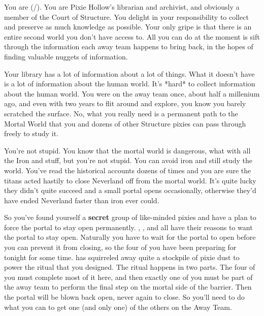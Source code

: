 \documentclass[char]{PP}
\begin{document}
\name{\cSLibrarian{}}

You are \cSLibrarian{} (\cSLibrarian{\They}/\cSLibrarian{\Them}). You are Pixie Hollow’s librarian and archivist, and obviously a member of the Court of Structure. You delight in your responsibility to collect and preserve as much knowledge as possible. Your only gripe is that there is an entire second world you don’t have access to. All you can do at the moment is sift through the information each away team happens to bring back, in the hopes of finding valuable nuggets of information.

Your library has a lot of information about a lot of things. What it doesn’t have is a lot of information about the human world. It’s *hard* to collect information about the human world. You were on the away team once, about half a millenium ago, and even with two years to flit around and explore, you know you barely scratched the surface. No, what you really need is a permanent path to the Mortal World that you and dozens of other Structure pixies can pass through freely to study it.

You’re not stupid. You know that the mortal world is dangerous, what with all the Iron and stuff, but you’re not stupid. You can avoid iron and still study the world. You’ve read the historical accounts dozens of times and you are sure the titans acted hastily to close Neverland off from the mortal world. It’s quite lucky they didn’t quite succeed and a small portal opens occasionally, otherwise they’d have ended Neverland faster than iron ever could.

So you’ve found yourself a \textbf{secret} group of like-minded pixies and have a plan to force the portal to stay open permanently. \cFHeart{}, \cESweet{}, and \cMIron{} all have their reasons to want the portal to stay open. Naturally you have to wait for the portal to open before you can prevent it from closing, so the four of you have been preparing for tonight for some time. \cMIron{} has squirreled away quite a stockpile of pixie dust to power the ritual that you designed. The ritual happens in two parts. The four of you must complete most of it here, and then exactly one of you must be part of the away team to perform the final step on the mortal side of the barrier. Then the portal will be blown back open, never again to close. So you’ll need to do what you can to get one (and only one) of the others on the Away Team.
\end{document}

